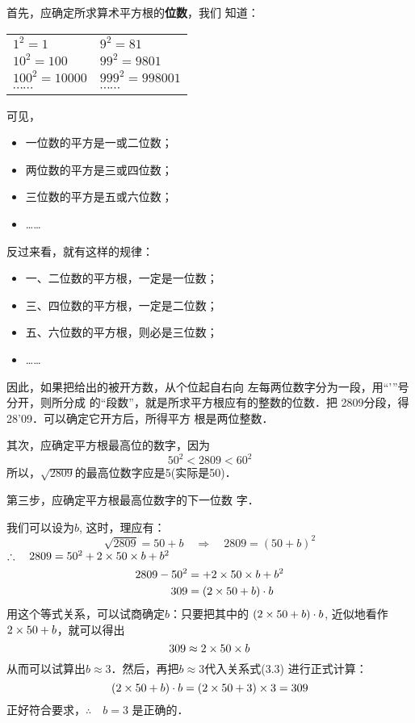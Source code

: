 \begin{solution}
    首先，应确定所求算术平方根的\textbf{位数}，我们
知道：
\begin{center}
    \begin{tabular}{ll}
       $1^2=1$   &  $9^2=81$ \\
       $10^2=100$   &  $99^2=9801$ \\
       $100^2=10000$   &  $999^2=998001$ \\
       $\cdots\cdots$   &  $\cdots\cdots$ \\ 
    \end{tabular}
\end{center}

可见，
\begin{itemize}
    \item 一位数的平方是一或二位数；
    \item 两位数的平方是三或四位数；
    \item 三位数的平方是五或六位数；
    \item ……
\end{itemize}


反过来看，就有这样的规律：
\begin{itemize}
    \item 一、二位数的平方根，一定是一位数；
    \item 三、四位数的平方根，一定是二位数；
    \item 五、六位数的平方根，则必是三位数；
    \item ……
\end{itemize}

因此，如果把给出的被开方数，从个位起自右向
左每两位数字分为一段，用“'”号分开，则所分成
的“段数”，就是所求平方根应有的整数的位数．把
2809分段，得28'09．可以确定它开方后，所得平方
根是两位整数．

其次，应确定平方根最高位的数字，因为
$$50^2<2809<60^2$$
所以，$\sqrt{2809}$的最高位数字应是5(实际是50)．

第三步，应确定平方根最高位数字的下一位数
字．

我们可以设为$b$, 这时，理应有：
\[\sqrt{2809}=50+b  \quad \Rightarrow\quad 2809=(50+b)^2\]
$\therefore\quad 2809=50^2+2\times 50\times b+b^2$
\begin{align}
    2809-50^2&=+2\times 50\times b+b^2 \nonumber \\
    309&=(2\times 50+b)\cdot b
\end{align}
用这个等式关系，可以试商确定$b$：只要把其中的
$(2\times50+b)\cdot b$, 近似地看作$2\times50+b$，就可以得出
\[309\approx 2\times50\times b\]
从而可以试算出$b\approx 3$．然后，再把$b\approx 3$代入关系式(3.3)
进行正式计算：
\[(2\times50+b)\cdot b=(2\times50+3)\times3=309\]
正好符合要求，$\therefore\quad b=3$ 是正确的．


\end{solution}
